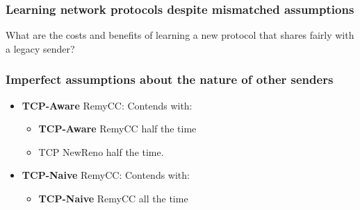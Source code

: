 \begin{frame}
\frametitle{Learning network protocols despite mismatched assumptions}
\begin{centering}
What are the costs and benefits of learning a new protocol that shares fairly with a legacy sender?
\end{centering}
\end{frame}

\begin{frame}
\frametitle{Imperfect assumptions about the nature of other senders}
\begin{itemize}
\item<1-> \textbf{TCP-Aware} RemyCC: Contends with:
 \begin{itemize}
 \item \textbf{TCP-Aware} RemyCC half the time
 \item TCP NewReno half the time.
 \end{itemize}
\item<2-> \textbf{TCP-Naive} RemyCC: Contends with:
 \begin{itemize}
 \item \textbf{TCP-Naive} RemyCC all the time
 \end{itemize}
\end{itemize}
\end{frame}

